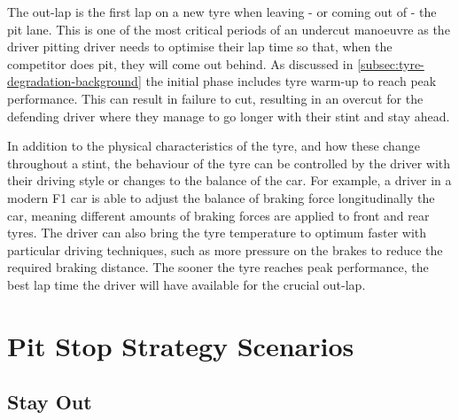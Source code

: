 
The out-lap is the first lap on a new tyre when leaving - or coming out of - the pit lane. This is one of the most critical periods of an undercut manoeuvre as the driver pitting driver needs to optimise their lap time so that, when the competitor does pit, they will come out behind. As discussed in \cref{subsec:tyre-degradation-background} the initial phase includes tyre warm-up to reach peak performance. This can result in failure to cut, resulting in an overcut for the defending driver where they manage to go longer with their stint and stay ahead.

In addition to the physical characteristics of the tyre, and how these change throughout a stint, the behaviour of the tyre can be controlled by the driver with their driving style or changes to the balance of the car. For example, a driver in a modern F1 car is able to adjust the balance of braking force longitudinally the car, meaning different amounts of braking forces are applied to front and rear tyres. The driver can also bring the tyre temperature to optimum faster with particular driving techniques, such as more pressure on the brakes to reduce the required braking distance. The sooner the tyre reaches peak performance, the best lap time the driver will have available for the crucial out-lap.

\section{Pit Stop Strategy Scenarios}
\label{sec:pit-stop-scenarios}


\subsection{Stay Out}
\label{subsec:stay-out}


